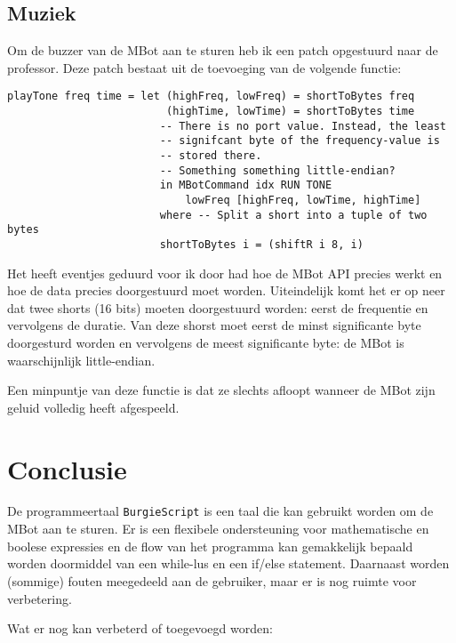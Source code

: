 \documentclass[11pt]{article}
\begin{document}
\subsection{Muziek}
Om de buzzer van de MBot aan te sturen heb ik een patch opgestuurd naar de professor. Deze patch bestaat uit de toevoeging van de volgende functie:
\begin{lstlisting}[language=Haksell]
playTone freq time = let (highFreq, lowFreq) = shortToBytes freq
                         (highTime, lowTime) = shortToBytes time
                        -- There is no port value. Instead, the least
                        -- signifcant byte of the frequency-value is
                        -- stored there.
                        -- Something something little-endian?
                        in MBotCommand idx RUN TONE
                            lowFreq [highFreq, lowTime, highTime]
                        where -- Split a short into a tuple of two bytes
                        shortToBytes i = (shiftR i 8, i)
\end{lstlisting}
Het heeft eventjes geduurd voor ik door had hoe de MBot API precies werkt en hoe de data precies doorgestuurd moet worden. Uiteindelijk komt het er op neer dat twee shorts (16 bits) moeten doorgestuurd worden: eerst de frequentie en vervolgens de duratie. Van deze shorst moet eerst de minst significante byte doorgesturd worden en vervolgens de meest significante byte: de MBot is waarschijnlijk little-endian.

Een minpuntje van deze functie is dat ze slechts afloopt wanneer de MBot zijn geluid volledig heeft afgespeeld.
\section{Conclusie}
De programmeertaal \texttt{BurgieScript} is een taal die kan gebruikt worden om de MBot aan te sturen. Er is een flexibele ondersteuning voor mathematische en boolese expressies en de flow van het programma kan gemakkelijk bepaald worden doormiddel van een while-lus en een if/else statement. Daarnaast worden (sommige) fouten meegedeeld aan de gebruiker, maar er is nog ruimte voor verbetering.

Wat er nog kan verbeterd of toegevoegd worden:
\end{document}
